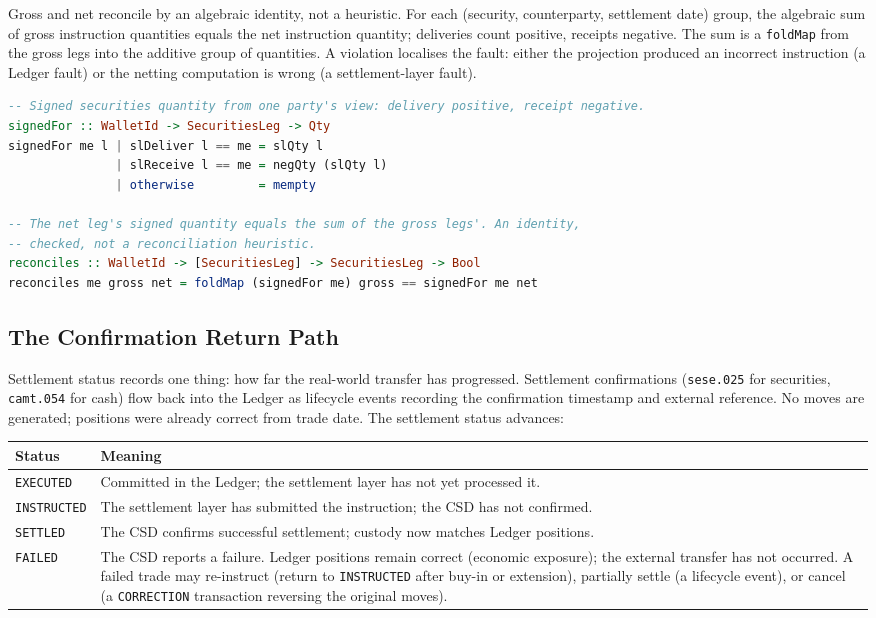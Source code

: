 Gross and net reconcile by an algebraic identity, not a heuristic. For each (security, counterparty, settlement date) group, the algebraic sum of gross instruction quantities equals the net instruction quantity; deliveries count positive, receipts negative. The sum is a \texttt{foldMap} from the gross legs into the additive group of quantities. A violation localises the fault: either the projection produced an incorrect instruction (a Ledger fault) or the netting computation is wrong (a settlement-layer fault).

\begin{lstlisting}[language=Haskell]
-- Signed securities quantity from one party's view: delivery positive, receipt negative.
signedFor :: WalletId -> SecuritiesLeg -> Qty
signedFor me l | slDeliver l == me = slQty l
               | slReceive l == me = negQty (slQty l)
               | otherwise         = mempty

-- The net leg's signed quantity equals the sum of the gross legs'. An identity,
-- checked, not a reconciliation heuristic.
reconciles :: WalletId -> [SecuritiesLeg] -> SecuritiesLeg -> Bool
reconciles me gross net = foldMap (signedFor me) gross == signedFor me net
\end{lstlisting}

\subsection{The Confirmation Return Path}
\label{sec:settlement-confirmation}

Settlement status records one thing: how far the real-world transfer has progressed. Settlement confirmations (\texttt{sese.025} for securities, \texttt{camt.054} for cash) flow back into the Ledger as lifecycle events recording the confirmation timestamp and external reference. No moves are generated; positions were already correct from trade date. The settlement status advances:

\begin{center}
\begin{tabular}{l p{10.5cm}}
\toprule
\textbf{Status} & \textbf{Meaning} \\
\midrule
\texttt{EXECUTED}   & Committed in the Ledger; the settlement layer has not yet processed it. \\
\texttt{INSTRUCTED} & The settlement layer has submitted the instruction; the CSD has not confirmed. \\
\texttt{SETTLED}    & The CSD confirms successful settlement; custody now matches Ledger positions. \\
\texttt{FAILED}     & The CSD reports a failure. Ledger positions remain correct (economic exposure); the external transfer has not occurred. A failed trade may re-instruct (return to \texttt{INSTRUCTED} after buy-in or extension), partially settle (a lifecycle event), or cancel (a \texttt{CORRECTION} transaction reversing the original moves). \\
\bottomrule
\end{tabular}
\end{center}

